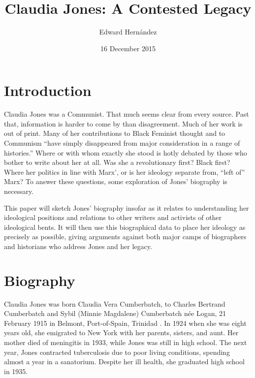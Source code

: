 \documentclass[man,12pt,natbib]{apa6}
\begin{document}
\title{Claudia Jones: A Contested Legacy}
\author{Edward Hern\'{a}ndez}
\date{16 December 2015}
\maketitle


\section{Introduction}

Claudia Jones was a Communist. That much seems clear from every source. Past
that, information is harder to come by than disagreement.  Much of her work is
out of print. Many of her contributions to Black Feminist thought and to
Communism ``have simply disappeared from major consideration in a range of
histories.''\citep[Ch.~1]{Davies11} Where or with whom exactly she stood is
hotly debated by those who bother to write about her at all. Was she a
revolutionary first? Black first? Where her politics in line with Marx', or is
her ideology separate from, ``left of''\citep{Davies11} Marx?  To answer these
questions, some exploration of Jones' biography is necessary.

This paper will sketch Jones' biography insofar as it relates to understanding
her ideological positions and relations to other writers and activists of other
ideological bents. It will then use this biographical data to place her
ideology as precisely as possible, giving arguments against both major camps of
biographers and historians who address Jones and her legacy.

\section{Biography}

Claudia Jones was born Claudia Vera Cumberbatch, to Charles Bertrand
Cumberbatch and Sybil (Minnie Magdalene) Cumberbatch n{\'{e}}e Logan, 21
February 1915 in Belmont, Port-of-Spain, Trinidad
\citep[Chronology~section]{Davies08}. In 1924 when she was eight years old, she
emigrated to New York with her parents, sisters, and aunt. Her mother died of 
meningitis in 1933, while Jones was still in high school. The next year, Jones
contracted tuberculosis due to poor living conditions, spending almost a year
in a sanatorium. Despite her ill health, she graduated high school in 1935.
\end{document}
